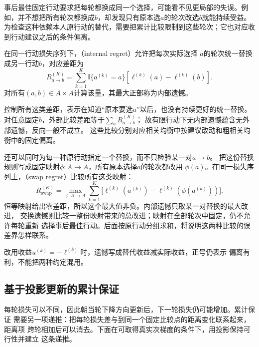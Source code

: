 事后最佳固定行动要求把每轮都换成同一个选择，可能看不见更局部的失误。例如，并不想把所有轮次都换成\(b\)，却发现只有原本选\(a\)的轮次改选\(b\)就能持续受益。为检查这种依赖本人原行动的替代，需要把累计比较限制到这些轮次；它也对应收到行动建议之后的条件偏离。
\begin{definition}[内部遗憾]
\label{def:game-internal-regret}
在同一行动损失序列下，（internal regret）允许把每次实际选择
\(a\)的轮次统一替换成另一行动\(b\)，对应差距为
\[
  R_{a\to b}^{(K)}
  =\sum_{k=1}^K\mathbb I\{a^{(k)}=a\}
    [\ell^{(k)}(a)-\ell^{(k)}(b)].
\]
对所有\((a,b)\in A\times A\)计算该量，其最大正部称为内部遗憾。
\end{definition}
控制所有这类差距，表示在知道“原本要选\(a\)”以后，也没有持续更好的统一替换。
对任意固定\(b\)，外部比较差距等于\(\sum_aR_{a\to b}^{(K)}\)；
故有限行动下无内部遗憾蕴含无外部遗憾，反向一般不成立。
这些比较分别对应相关均衡中按建议改动和粗相关均衡中的固定偏离。

还可以同时为每一种原行动指定一个替换，而不只检验某一对\(a\to b\)。
把这份替换规则写成固定映射\(\phi:A\to A\)，所有原本选择\(a\)的轮次都改用
\(\phi(a)\)。在同一损失序列上，（swap regret）比较所有这类映射：
\begin{equation}
  R_{\mathrm{swap}}^{(K)}
  =\max_{\phi:A\to A}\sum_{k=1}^{K}
  \bigl[\ell^{(k)}(a^{(k)})-\ell^{(k)}(\phi(a^{(k)}))\bigr].
  \label{eq:game-swap-regret}
\end{equation}
恒等映射给出零差距，所以这个最大值非负。内部遗憾只取某一对替换的最大改进，
交换遗憾则比较一整份映射带来的总改进；映射在全部轮次中固定，仍不允许每轮重新
选择事后最佳行动。后面按原行动分组求和，将说明这两种比较的误差界怎样联系。

改用收益\(u^{(k)}=-\ell^{(k)}\)时，遗憾写成替代收益减实际收益，正号仍表示
偏离有利，不能把两种约定混用。

\subsection{基于投影更新的累计保证}
\label{sec:game-projection-regret}

每轮损失可以不同，因此朝当轮下降方向更新后，下一轮损失仍可能增加。累计保证
需要另一项递推：把每轮损失差与到同一个固定比较点的距离变化联系起来，距离项
跨轮相加后可以消去。下面在可取得真实次梯度的条件下，用投影保持可行性并建立
这条递推。

